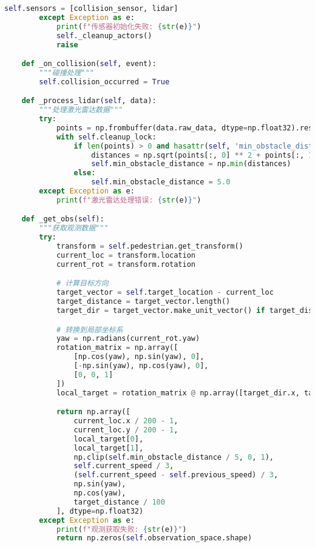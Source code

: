 \begin{lstlisting}[language=Python]
            self.sensors = [collision_sensor, lidar]
        except Exception as e:
            print(f"传感器初始化失败: {str(e)}")
            self._cleanup_actors()
            raise

    def _on_collision(self, event):
        """碰撞处理"""
        self.collision_occurred = True

    def _process_lidar(self, data):
        """处理激光雷达数据"""
        try:
            points = np.frombuffer(data.raw_data, dtype=np.float32).reshape(-1, 4)
            with self.cleanup_lock:
                if len(points) > 0 and hasattr(self, 'min_obstacle_distance'):
                    distances = np.sqrt(points[:, 0] ** 2 + points[:, 1] ** 2)
                    self.min_obstacle_distance = np.min(distances)
                else:
                    self.min_obstacle_distance = 5.0
        except Exception as e:
            print(f"激光雷达处理错误: {str(e)}")

    def _get_obs(self):
        """获取观测数据"""
        try:
            transform = self.pedestrian.get_transform()
            current_loc = transform.location
            current_rot = transform.rotation

            # 计算目标方向
            target_vector = self.target_location - current_loc
            target_distance = target_vector.length()
            target_dir = target_vector.make_unit_vector() if target_distance > 0 else carla.Vector3D()

            # 转换到局部坐标系
            yaw = np.radians(current_rot.yaw)
            rotation_matrix = np.array([
                [np.cos(yaw), np.sin(yaw), 0],
                [-np.sin(yaw), np.cos(yaw), 0],
                [0, 0, 1]
            ])
            local_target = rotation_matrix @ np.array([target_dir.x, target_dir.y, target_dir.z])

            return np.array([
                current_loc.x / 200 - 1,
                current_loc.y / 200 - 1,
                local_target[0],
                local_target[1],
                np.clip(self.min_obstacle_distance / 5, 0, 1),
                self.current_speed / 3,
                (self.current_speed - self.previous_speed) / 3,
                np.sin(yaw),
                np.cos(yaw),
                target_distance / 100
            ], dtype=np.float32)
        except Exception as e:
            print(f"观测获取失败: {str(e)}")
            return np.zeros(self.observation_space.shape)

\end{lstlisting}
